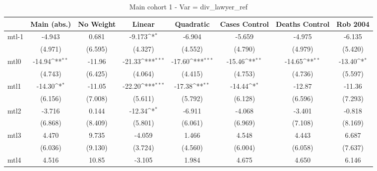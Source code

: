 \documentclass{article}
\begin{document}
{
\def\sym#1{\ifmmode^{#1}\else\(^{#1}\)\fi}
\begin{longtable}{l*{7}{c}}
\caption{Main cohort 1 - Var = div\_lawyer\_ref}\\
\hline\hline\endfirsthead\hline\endhead\hline\endfoot\endlastfoot
                &\multicolumn{1}{c}{Main (abs.)}&\multicolumn{1}{c}{No Weight}&\multicolumn{1}{c}{Linear}&\multicolumn{1}{c}{Quadratic}&\multicolumn{1}{c}{Cases Control}&\multicolumn{1}{c}{Deaths Control}&\multicolumn{1}{c}{Rob 2004}\\
\hline
mtl-1           &   -4.943         &    0.681         &   -9.173\sym{*}  &   -6.904         &   -5.659         &   -4.975         &   -6.135         \\
                &  (4.971)         &  (6.595)         &  (4.327)         &  (4.552)         &  (4.790)         &  (4.979)         &  (5.420)         \\
mtl0            &   -14.94\sym{**} &   -11.96         &   -21.33\sym{***}&   -17.60\sym{***}&   -15.46\sym{**} &   -14.65\sym{**} &   -13.40\sym{*}  \\
                &  (4.743)         &  (6.425)         &  (4.064)         &  (4.415)         &  (4.753)         &  (4.736)         &  (5.597)         \\
mtl1            &   -14.30\sym{*}  &   -11.05         &   -22.20\sym{***}&   -17.38\sym{**} &   -14.44\sym{*}  &   -12.87         &   -11.36         \\
                &  (6.156)         &  (7.008)         &  (5.611)         &  (5.792)         &  (6.128)         &  (6.596)         &  (7.293)         \\
mtl2            &   -3.716         &    0.144         &   -12.34\sym{*}  &   -6.911         &   -4.068         &   -3.401         &   -0.818         \\
                &  (6.868)         &  (8.409)         &  (5.801)         &  (6.061)         &  (6.969)         &  (7.108)         &  (8.169)         \\
mtl3            &    4.470         &    9.735         &   -4.059         &    1.466         &    4.548         &    4.443         &    6.687         \\
                &  (6.036)         &  (9.130)         &  (3.724)         &  (4.560)         &  (6.004)         &  (6.058)         &  (7.637)         \\
mtl4            &    4.516         &    10.85         &   -3.105         &    1.984         &    4.675         &    4.650         &    6.146         \\

\end{longtable}}
\end{document}
